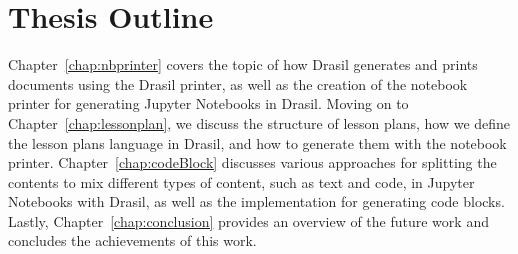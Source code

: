 \section{Thesis Outline}
Chapter~\ref{chap:nbprinter} covers the topic of how Drasil generates and 
prints documents using the Drasil printer, as well as the creation of the 
notebook printer for generating Jupyter Notebooks in Drasil. Moving on to 
Chapter~\ref{chap:lessonplan}, we discuss the structure of lesson plans, how we 
define the lesson plans language in Drasil, and how to generate them with the 
notebook printer. Chapter~\ref{chap:codeBlock} discusses various approaches for 
splitting the contents to mix different types of content, such as text and 
code, in Jupyter Notebooks with Drasil, as well as the implementation for 
generating code blocks. Lastly, Chapter~\ref{chap:conclusion} provides an 
overview of the future work and concludes the achievements of this work.